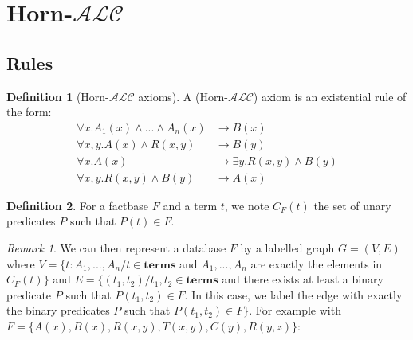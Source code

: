 \documentclass{article}
\theoremstyle{definition}
\newtheorem{definition}{Definition}[section]
\theoremstyle{remark}
\newtheorem{remark}{Remark}[section]
\begin{document}
\section{Horn-$\mathcal{ALC}$}

\subsection{Rules}

\begin{definition}[Horn-$\mathcal{ALC}$ axioms]
A (Horn-$\mathcal{ALC}$) axiom is an existential rule of the form:
\begin{align}
\forall x.A_1(x) \wedge...\wedge A_n(x) &\rightarrow B(x) \\
\forall x,y.A(x) \wedge R(x,y) &\rightarrow B(y) \\
\forall x.A(x) &\rightarrow \exists y.R(x,y) \wedge B(y) \\
\forall x,y.R(x,y) \wedge B(y) &\rightarrow A(x)
\end{align}
\end{definition}

\begin{definition}
For a factbase $F$ and a term $t$, we note $C_F(t)$ the set of unary predicates $P$ such that $P(t)\in F$.
\end{definition}

\begin{remark}
We can then represent a database $F$ by a labelled graph $G = (V,E)$ where $V = \{t:A_1,...,A_n /t \in \textbf{terms}$ and $A_1,...,A_n$ are exactly the elements in $C_F(t)\}$ and $E = \{(t_1,t_2) /t_1,t_2 \in \textbf{terms}$ and there exists at least a binary predicate $P$ such that $P(t_1,t_2) \in F$. In this case, we label the edge with exactly the binary predicates $P$ such that $P(t_1,t_2) \in F\}$. For example with $F = \{A(x), B(x),R(x,y),T(x,y),C(y),R(y,z)\}$: \\

\end{remark}
\end{document}

